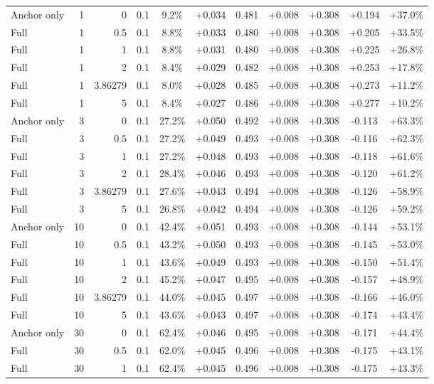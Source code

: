 \begin{table}[htbp]
\begin{tabular}{lrrrccccccc}
Anchor only & 1 & 0 & 0.1 & 9.2\% & +0.034 & 0.481 & +0.008 & +0.308 & +0.194 & +37.0\% \\
Full & 1 & 0.5 & 0.1 & 8.8\% & +0.033 & 0.480 & +0.008 & +0.308 & +0.205 & +33.5\% \\
Full & 1 & 1 & 0.1 & 8.8\% & +0.031 & 0.480 & +0.008 & +0.308 & +0.225 & +26.8\% \\
Full & 1 & 2 & 0.1 & 8.4\% & +0.029 & 0.482 & +0.008 & +0.308 & +0.253 & +17.8\% \\
Full & 1 & 3.86279 & 0.1 & 8.0\% & +0.028 & 0.485 & +0.008 & +0.308 & +0.273 & +11.2\% \\
Full & 1 & 5 & 0.1 & 8.4\% & +0.027 & 0.486 & +0.008 & +0.308 & +0.277 & +10.2\% \\
Anchor only & 3 & 0 & 0.1 & 27.2\% & +0.050 & 0.492 & +0.008 & +0.308 & -0.113 & +63.3\% \\
Full & 3 & 0.5 & 0.1 & 27.2\% & +0.049 & 0.493 & +0.008 & +0.308 & -0.116 & +62.3\% \\
Full & 3 & 1 & 0.1 & 27.2\% & +0.048 & 0.493 & +0.008 & +0.308 & -0.118 & +61.6\% \\
Full & 3 & 2 & 0.1 & 28.4\% & +0.046 & 0.493 & +0.008 & +0.308 & -0.120 & +61.2\% \\
Full & 3 & 3.86279 & 0.1 & 27.6\% & +0.043 & 0.494 & +0.008 & +0.308 & -0.126 & +58.9\% \\
Full & 3 & 5 & 0.1 & 26.8\% & +0.042 & 0.494 & +0.008 & +0.308 & -0.126 & +59.2\% \\
Anchor only & 10 & 0 & 0.1 & 42.4\% & +0.051 & 0.493 & +0.008 & +0.308 & -0.144 & +53.1\% \\
Full & 10 & 0.5 & 0.1 & 43.2\% & +0.050 & 0.493 & +0.008 & +0.308 & -0.145 & +53.0\% \\
Full & 10 & 1 & 0.1 & 43.6\% & +0.049 & 0.493 & +0.008 & +0.308 & -0.150 & +51.4\% \\
Full & 10 & 2 & 0.1 & 45.2\% & +0.047 & 0.495 & +0.008 & +0.308 & -0.157 & +48.9\% \\
Full & 10 & 3.86279 & 0.1 & 44.0\% & +0.045 & 0.497 & +0.008 & +0.308 & -0.166 & +46.0\% \\
Full & 10 & 5 & 0.1 & 43.6\% & +0.043 & 0.497 & +0.008 & +0.308 & -0.174 & +43.4\% \\
Anchor only & 30 & 0 & 0.1 & 62.4\% & +0.046 & 0.495 & +0.008 & +0.308 & -0.171 & +44.4\% \\
Full & 30 & 0.5 & 0.1 & 62.0\% & +0.045 & 0.496 & +0.008 & +0.308 & -0.175 & +43.1\% \\
Full & 30 & 1 & 0.1 & 62.4\% & +0.045 & 0.496 & +0.008 & +0.308 & -0.175 & +43.3\% \\

\end{tabular}
\end{table}
